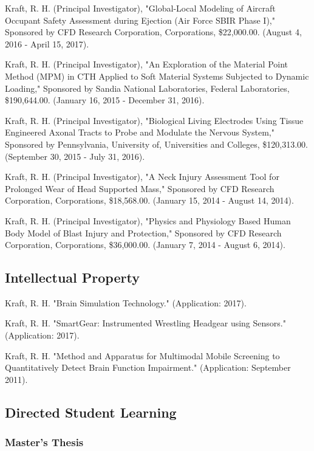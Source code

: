 \documentclass[
]{article}
\begin{document}
Kraft, R. H. (Principal Investigator), "Global-Local Modeling of
Aircraft Occupant Safety Assessment during Ejection (Air Force SBIR
Phase I)," Sponsored by CFD Research Corporation, Corporations,
\$22,000.00. (August 4, 2016 - April 15, 2017).

Kraft, R. H. (Principal Investigator), "An Exploration of the Material
Point Method (MPM) in CTH Applied to Soft Material Systems Subjected to
Dynamic Loading," Sponsored by Sandia National Laboratories, Federal
Laboratories, \$190,644.00. (January 16, 2015 - December 31, 2016).

Kraft, R. H. (Principal Investigator), "Biological Living Electrodes
Using Tissue Engineered Axonal Tracts to Probe and Modulate the Nervous
System," Sponsored by Pennsylvania, University of, Universities and
Colleges, \$120,313.00. (September 30, 2015 - July 31, 2016).

Kraft, R. H. (Principal Investigator), "A Neck Injury Assessment Tool
for Prolonged Wear of Head Supported Mass," Sponsored by CFD Research
Corporation, Corporations, \$18,568.00. (January 15, 2014 - August 14,
2014).

Kraft, R. H. (Principal Investigator), "Physics and Physiology Based
Human Body Model of Blast Injury and Protection," Sponsored by CFD
Research Corporation, Corporations, \$36,000.00. (January 7, 2014 -
August 6, 2014).

\subsection{Intellectual Property}\label{intellectual-property}

Kraft, R. H. "Brain Simulation Technology." (Application: 2017).

Kraft, R. H. "SmartGear: Instrumented Wrestling Headgear using Sensors."
(Application: 2017).

Kraft, R. H. "Method and Apparatus for Multimodal Mobile Screening to
Quantitatively Detect Brain Function Impairment." (Application:
September 2011).

\subsection{Directed Student Learning}\label{directed-student-learning}

\subsubsection{Master's Thesis}\label{masters-thesis}
\end{document}
